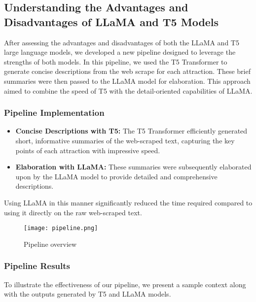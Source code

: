 \documentclass[conference]{IEEEtran}
\begin{document}
    \subsection{Understanding the Advantages and Disadvantages of LLaMA and T5 Models}

        After assessing the advantages and disadvantages of both the LLaMA and T5 large language models, we developed a new pipeline designed to leverage the strengths of both models. In this pipeline, we used the T5 Transformer to generate concise descriptions from the web scrape for each attraction. These brief summaries were then passed to the LLaMA model for elaboration. This approach aimed to combine the speed of T5 with the detail-oriented capabilities of LLaMA.\\

        \subsubsection{{\textbf{Pipeline Implementation}}}
            \begin{itemize}
                \item \textbf{Concise Descriptions with T5:} The T5 Transformer efficiently generated short, informative summaries of the web-scraped text, capturing the key points of each attraction with impressive speed.
                \item \textbf{Elaboration with LLaMA:} These summaries were subsequently elaborated upon by the LLaMA model to provide detailed and comprehensive descriptions.
            \end{itemize}


            Using LLaMA in this manner significantly reduced the time required compared to using it directly on the raw web-scraped text.

            \begin{figure}
                \centering
                \texttt{[image: pipeline.png]}
                \caption{Pipeline overview}
                \label{fig:pipelineoverview}
            \end{figure}

        \subsubsection{\textbf{Pipeline Results}}

            To illustrate the effectiveness of our pipeline, we present a sample context along with the outputs generated by T5 and LLaMA models.
\end{document}

